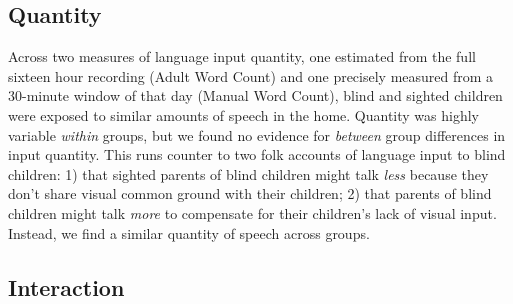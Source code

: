 \documentclass[
  man]{apa6}
\begin{document}
\hypertarget{quantity-1}{%
\subsection{Quantity}\label{quantity-1}}

Across two measures of language input quantity, one estimated from the full sixteen hour recording (Adult Word Count) and one precisely measured from a 30-minute window of that day (Manual Word Count), blind and sighted children were exposed to similar amounts of speech in the home. Quantity was highly variable \emph{within} groups, but we found no evidence for \emph{between} group differences in input quantity. This runs counter to two folk accounts of language input to blind children: 1) that sighted parents of blind children might talk \emph{less} because they don't share visual common ground with their children; 2) that parents of blind children might talk \emph{more} to compensate for their children's lack of visual input. Instead, we find a similar quantity of speech across groups.

\hypertarget{interaction-2}{%
\subsection{Interaction}\label{interaction-2}}
\end{document}
